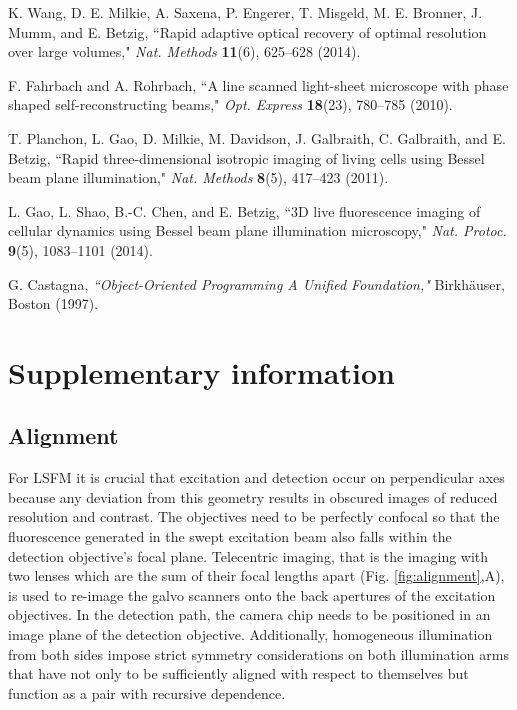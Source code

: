 \documentclass[12pt]{spieman}  %
\begin{document}
\begin{spacing}{2}
\begin{thebibliography}{0}
 K. Wang, D. E. Milkie, A. Saxena, P. Engerer, T. Misgeld, M. E. Bronner, J. Mumm, and E. Betzig, ``Rapid adaptive optical recovery of optimal resolution over large volumes," \emph{Nat. Methods} \textbf{11}(6), 625–628 (2014).

 F. Fahrbach and A. Rohrbach, ``A line scanned light-sheet microscope with phase shaped self-reconstructing beams," \emph{Opt. Express} \textbf{18}(23), 780–785 (2010).

 T. Planchon, L. Gao, D. Milkie, M. Davidson, J. Galbraith, C. Galbraith, and E. Betzig, ``Rapid three-dimensional isotropic imaging of living cells using Bessel beam plane illumination," \emph{Nat. Methods} \textbf{8}(5), 417–423 (2011).

 L. Gao, L. Shao, B.-C. Chen, and E. Betzig, ``3D live fluorescence imaging of cellular dynamics using Bessel beam plane illumination microscopy," \emph{Nat. Protoc.} \textbf{9}(5), 1083–1101 (2014).

 G. Castagna, \emph{``Object-Oriented Programming A Unified Foundation,"} Birkh{\"a}user, Boston (1997).

\end{thebibliography}

\pagebreak
\section{Supplementary information}

\subsection{Alignment}

For LSFM it is crucial that excitation and detection occur on perpendicular axes because any deviation from this geometry results in obscured images of reduced resolution and contrast. The objectives need to be perfectly confocal so that the fluorescence generated in the swept excitation beam also falls within the detection objective's focal plane. Telecentric imaging, that is the imaging with two lenses which are the sum of their focal lengths apart (Fig. \ref{fig:alignment},A), is used to re-image the galvo scanners onto the back apertures of the excitation objectives. In the detection path, the camera chip needs to be positioned in an image plane of the detection objective. Additionally, homogeneous illumination from both sides impose strict symmetry considerations on both illumination arms that have not only to be sufficiently aligned with respect to themselves but function as a pair with recursive dependence. 


\end{spacing}
\end{document}
